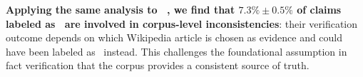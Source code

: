 \textbf{Applying the same analysis to \feverous~\cite{aly-etal-2021-fact}, we find that $7.3\% \pm 0.5\%$ of claims labeled as \supports~are involved in corpus-level inconsistencies}: their verification outcome depends on which Wikipedia article is chosen as evidence and could have been labeled as ~instead. This challenges the foundational assumption in fact verification that the corpus provides a consistent source of truth. 
